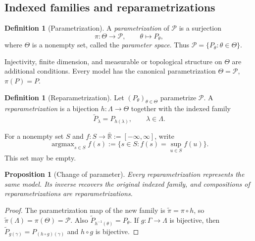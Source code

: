 \documentclass[11pt,oneside]{book}
\newtheorem{proposition}[theorem]{Proposition}
\theoremstyle{definition}
\newtheorem{definition}[theorem]{Definition}
\theoremstyle{remark}
\DeclareMathOperator{\argmax}{argmax}
\newcommand{\R}{\mathbb R}
\begin{document}
\subsection{Indexed families and reparametrizations}
\label{subsec:parametrizations}

\begin{definition}[Parametrization]
\label{def:parametrization}
A \emph{parametrization} of $\mathcal P$ is a surjection
\[
\pi:\Theta\longrightarrow\mathcal P,\qquad \theta\longmapsto P_\theta,
\]
where $\Theta$ is a nonempty set, called the \emph{parameter space}.
Thus $\mathcal P=\{P_\theta:\theta\in\Theta\}$.
\end{definition}

Injectivity, finite dimension, and measurable or topological structure on
$\Theta$ are additional conditions. Every model has the canonical
parametrization $\Theta=\mathcal P$, $\pi(P)=P$.

\begin{definition}[Reparametrization]
\label{def:reparametrization}
Let $(P_\theta)_{\theta\in\Theta}$ parametrize $\mathcal P$.
A \emph{reparametrization} is a bijection $h:\Lambda\to\Theta$ together with
the indexed family
\[
\widetilde P_\lambda=P_{h(\lambda)},\qquad \lambda\in\Lambda.
\]
\end{definition}

For a nonempty set $S$ and $f:S\to\overline{\R}:=[-\infty,\infty]$, write
\[
\argmax_{s\in S}f(s)
:=\{s\in S:f(s)=\sup_{u\in S}f(u)\}.
\]
This set may be empty.

\begin{proposition}[Change of parameter]
\label{prop:reparametrization}
Every reparametrization represents the same model. Its inverse recovers the
original indexed family, and compositions of reparametrizations are
reparametrizations.
\end{proposition}
\begin{proof}
The parametrization map of the new family is $\widetilde\pi=\pi\circ h$, so
$\widetilde\pi(\Lambda)=\pi(\Theta)=\mathcal P$. Also
$\widetilde P_{h^{-1}(\theta)}=P_\theta$.
If $g:\Gamma\to\Lambda$ is bijective, then
$\widetilde P_{g(\gamma)}=P_{(h\circ g)(\gamma)}$ and $h\circ g$ is bijective.
\end{proof}
\end{document}
